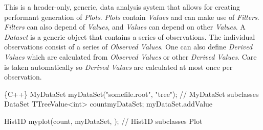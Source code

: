 This is a header-\/only, generic, data analysis system that allows for creating performant generation of {\itshape Plots}. {\itshape Plots} contain {\itshape Values} and can make use of {\itshape Filters}. {\itshape Filters} can also depend of {\itshape Values}, and {\itshape Values} can depend on other {\itshape Values}. A {\itshape Dataset} is a generic object that contains a series of observations. The individual observations consist of a series of {\itshape Observed Values}. One can also define {\itshape Derived Values} which are calculated from {\itshape Observed Values} or other {\itshape Derived Values}. Care is taken automatically so {\itshape Derived Values} are calculated at most once per observation.


\begin{DoxyCode}
\{C++\}
MyDataSet myDataSet("somefile.root", "tree"); // MyDataSet subclasses DataSet
TTreeValue<int> countmyDataSet;
myDataSet.addValue

Hist1D myplot(count, myDataSet, ); // Hist1D subclasses Plot
\end{DoxyCode}
 